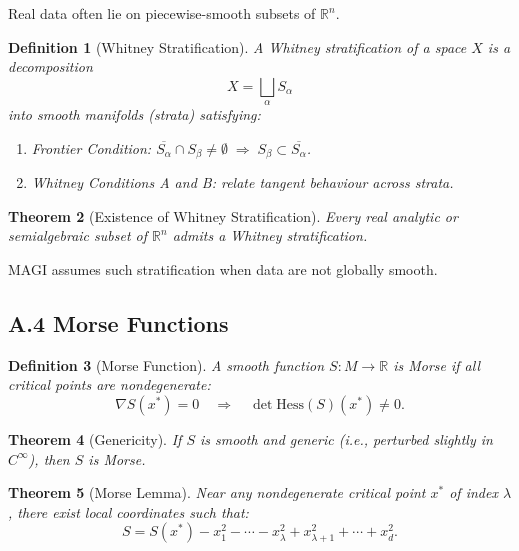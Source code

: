 \documentclass[11pt,a4paper,twocolumn]{article}
\newtheorem{theorem}{Theorem}[section]
\newtheorem{definition}[theorem]{Definition}
\begin{document}
Real data often lie on piecewise-smooth subsets of $\mathbb{R}^n$.

\begin{definition}[Whitney Stratification]
A Whitney stratification of a space $X$ is a decomposition
\[
X = \bigsqcup_{\alpha} S_\alpha
\]
into smooth manifolds (strata) satisfying:
\begin{enumerate}
\item Frontier Condition: $\overline{S_\alpha} \cap S_\beta \neq \emptyset
\;\Rightarrow\; S_\beta \subset \overline{S_\alpha}$.
\item Whitney Conditions A and B: relate tangent behaviour across strata.
\end{enumerate}
\end{definition}

\begin{theorem}[Existence of Whitney Stratification]
Every real analytic or semialgebraic subset of $\mathbb{R}^n$
admits a Whitney stratification.
\end{theorem}

MAGI assumes such stratification when data are not globally smooth.


\subsection*{A.4 Morse Functions}

\begin{definition}[Morse Function]
A smooth function $S : M \to \mathbb{R}$ is Morse if all critical points
are nondegenerate:
\[
\nabla S(x^\ast)=0 \quad\Rightarrow\quad 
\det \mathrm{Hess}(S)(x^\ast) \neq 0.
\]
\end{definition}

\begin{theorem}[Genericity]
If $S$ is smooth and generic (i.e., perturbed slightly in $C^\infty$),
then $S$ is Morse.
\end{theorem}

\begin{theorem}[Morse Lemma]
Near any nondegenerate critical point $x^\ast$ of index $\lambda$,
there exist local coordinates such that:
\[
S = S(x^\ast) - x_1^2 - \cdots - x_\lambda^2
+ x_{\lambda+1}^2 + \cdots + x_d^2.
\]
\end{theorem}
\end{document}
